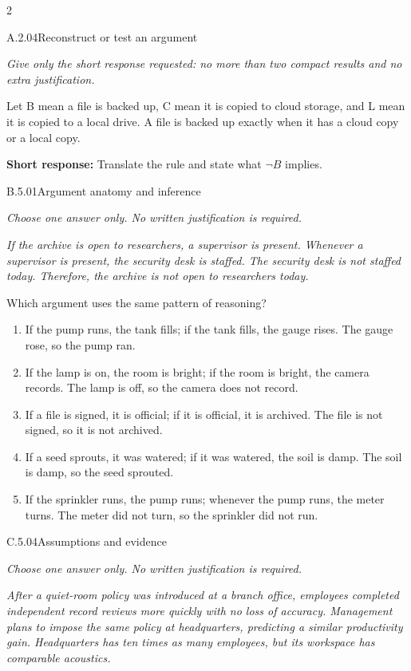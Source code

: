 \documentclass[9pt]{extarticle}
\newcommand{\choice}[1]{\item #1}
\begin{document}
\begin{multicols}{2}
\begin{DenseCoreProblem}{A.2.04}{Reconstruct or test an argument}
{\scriptsize\textit{Give only the short response requested: no more than two compact results and no extra justification.}\par}
Let B mean a file is backed up, C mean it is copied to cloud storage, and L mean it is copied to a local drive. A file is backed up exactly when it has a cloud copy or a local copy.

\textbf{Short response:} Translate the rule and state what $\neg B$ implies.
\end{DenseCoreProblem}
\begin{DenseCoreProblem}{B.5.01}{Argument anatomy and inference}
{\scriptsize\textit{Choose one answer only. No written justification is required.}\par}
\emph{If the archive is open to researchers, a supervisor is present. Whenever a supervisor is present, the security desk is staffed. The security desk is not staffed today. Therefore, the archive is not open to researchers today.}

Which argument uses the same pattern of reasoning?
\begin{enumerate}[label=(\alph*)]
  \choice{If the pump runs, the tank fills; if the tank fills, the gauge rises. The gauge rose, so the pump ran.}
  \choice{If the lamp is on, the room is bright; if the room is bright, the camera records. The lamp is off, so the camera does not record.}
  \choice{If a file is signed, it is official; if it is official, it is archived. The file is not signed, so it is not archived.}
  \choice{If a seed sprouts, it was watered; if it was watered, the soil is damp. The soil is damp, so the seed sprouted.}
  \choice{If the sprinkler runs, the pump runs; whenever the pump runs, the meter turns. The meter did not turn, so the sprinkler did not run.}
\end{enumerate}
\end{DenseCoreProblem}
\columnbreak
\begin{DenseCoreProblem}{C.5.04}{Assumptions and evidence}
{\scriptsize\textit{Choose one answer only. No written justification is required.}\par}
\emph{After a quiet-room policy was introduced at a branch office, employees completed independent record reviews more quickly with no loss of accuracy. Management plans to impose the same policy at headquarters, predicting a similar productivity gain. Headquarters has ten times as many employees, but its workspace has comparable acoustics.}


\end{DenseCoreProblem}
\end{multicols}
\end{document}
